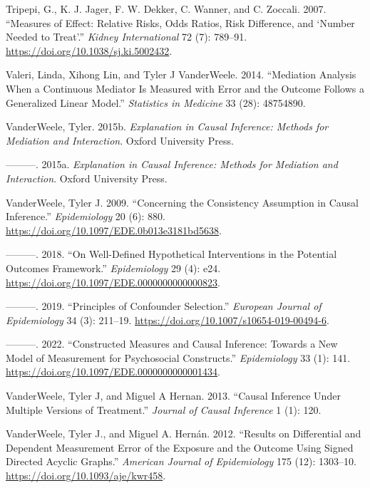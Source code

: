 \documentclass[
  singlecolumn]{article}
\newlength{\cslhangindent}
\newlength{\cslentryspacingunit} %
\newenvironment{CSLReferences}[2] %
 {%
  \setlength{\parindent}{0pt}
  \ifodd #1
  \let\oldpar\par
  \def\par{\hangindent=\cslhangindent\oldpar}
  \fi
  \setlength{\parskip}{#2\cslentryspacingunit}
 }%
 {}
\begin{document}
\begin{CSLReferences}{1}{0}
\leavevmode{}%
Tripepi, G., K. J. Jager, F. W. Dekker, C. Wanner, and C. Zoccali. 2007.
{``Measures of Effect: Relative Risks, Odds Ratios, Risk Difference, and
{`}Number Needed to Treat{'}.''} \emph{Kidney International} 72 (7):
789--91. \url{https://doi.org/10.1038/sj.ki.5002432}.

\leavevmode{}%
Valeri, Linda, Xihong Lin, and Tyler J VanderWeele. 2014. {``Mediation
Analysis When a Continuous Mediator Is Measured with Error and the
Outcome Follows a Generalized Linear Model.''} \emph{Statistics in
Medicine} 33 (28): 48754890.

\leavevmode{}%
VanderWeele, Tyler. 2015b. \emph{Explanation in Causal Inference:
Methods for Mediation and Interaction}. Oxford University Press.

\leavevmode{}%
---------. 2015a. \emph{Explanation in Causal Inference: Methods for
Mediation and Interaction}. Oxford University Press.

\leavevmode{}%
VanderWeele, Tyler J. 2009. {``Concerning the Consistency Assumption in
Causal Inference.''} \emph{Epidemiology} 20 (6): 880.
\url{https://doi.org/10.1097/EDE.0b013e3181bd5638}.

\leavevmode{}%
---------. 2018. {``On Well-Defined Hypothetical Interventions in the
Potential Outcomes Framework.''} \emph{Epidemiology} 29 (4): e24.
\url{https://doi.org/10.1097/EDE.0000000000000823}.

\leavevmode{}%
---------. 2019. {``Principles of Confounder Selection.''}
\emph{European Journal of Epidemiology} 34 (3): 211--19.
\url{https://doi.org/10.1007/s10654-019-00494-6}.

\leavevmode{}%
---------. 2022. {``Constructed Measures and Causal Inference: Towards a
New Model of Measurement for Psychosocial Constructs.''}
\emph{Epidemiology} 33 (1): 141.
\url{https://doi.org/10.1097/EDE.0000000000001434}.

\leavevmode{}%
VanderWeele, Tyler J, and Miguel A Hernan. 2013. {``Causal Inference
Under Multiple Versions of Treatment.''} \emph{Journal of Causal
Inference} 1 (1): 120.

\leavevmode{}%
VanderWeele, Tyler J., and Miguel A. Hernán. 2012. {``Results on
Differential and Dependent Measurement Error of the Exposure and the
Outcome Using Signed Directed Acyclic Graphs.''} \emph{American Journal
of Epidemiology} 175 (12): 1303--10.
\url{https://doi.org/10.1093/aje/kwr458}.


\end{CSLReferences}
\end{document}

